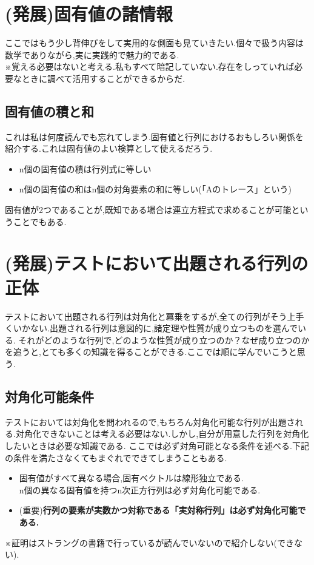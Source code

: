 \section{(発展)固有値の諸情報}
ここではもう少し背伸びをして実用的な側面も見ていきたい.個々で扱う内容は数学でありながら,実に実践的で魅力的である.\\
※覚える必要はないと考える.私もすべて暗記していない.存在をしっていれば必要なときに調べて活用することができるからだ.
\subsection{固有値の積と和}
これは私は何度読んでも忘れてしまう.固有値と行列におけるおもしろい関係を紹介する.これは固有値のよい検算として使えるだろう.
\begin{tcolorbox}[colframe=black!80,colback=white,title=行列式と要素に現れる固有値のヒント]
\begin{itemize}
    \item n個の固有値の積は行列式に等しい
    \item n個の固有値の和はn個の対角要素の和に等しい(「Aのトレース」という)
\end{itemize}
\end{tcolorbox}
\noindent
固有値が2つであることが,既知である場合は連立方程式で求めることが可能ということでもある.
\section{(発展)テストにおいて出題される行列の正体}
\label{sec:spectral}
テストにおいて出題される行列は対角化と冪乗をするが,全ての行列がそう上手くいかない.出題される行列は意図的に,諸定理や性質が成り立つものを選んでいる.
それがどのような行列で,どのような性質が成り立つのか？なぜ成り立つのかを追うと,とても多くの知識を得ることができる.ここでは順に学んでいこうと思う.
\hypertarget{parametric}{}
\subsection{対角化可能条件}
テストにおいては対角化を問われるので,もちろん対角化可能な行列が出題される.対角化できないことは考える必要はない.しかし,自分が用意した行列を対角化したいときは必要な知識である.
ここでは必ず対角可能となる条件を述べる.下記の条件を満たさなくてもまぐれでできてしまうこともある.
\begin{tcolorbox}[colframe=black!80,colback=white,title=対角可能条件]
\begin{itemize}
    \item 固有値がすべて異なる場合,固有ベクトルは線形独立である.\\
     n個の異なる固有値を持つn次正方行列は必ず対角化可能である.
    \item (重要)\textbf{行列の要素が実数かつ対称である「実対称行列」は必ず対角化可能である.}
\end{itemize}
\end{tcolorbox}
※証明はストラングの書籍\cite{strang}で行っているが読んでいないので紹介しない(できない).
